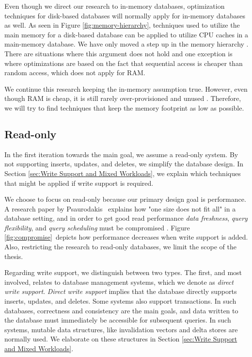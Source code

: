 Even though we direct our research to in-memory databases, optimization techniques for disk-based databases will normally apply for in-memory databases as well. As seen in Figure \ref{fig:memory-hierarchy}, techniques used to utilize the main memory for a disk-based database can be applied to utilize CPU caches in a main-memory database. We have only moved a step up in the memory hierarchy \cite{Boncz2002-yj}. There are situations where this argument does not hold and one exception is where optimizations are based on the fact that sequential access is cheaper than random access, which does not apply for RAM.

We continue this research keeping the in-memory assumption true. However, even though RAM is cheap, it is still rarely over-provisioned and unused \cite{Barber2014-ey}. Therefore, we will try to find techniques that keep the memory footprint as low as possible.


\subsection{Read-only}
\label{sub:Read-only}
In the first iteration towards the main goal, we assume a read-only system. By not supporting inserts, updates, and deletes, we simplify the database design. In Section \ref{sec:Write Support and Mixed Workloads}, we explain which techniques that might be applied if write support is required.

We choose to focus on read-only because our primary design goal is performance. A research paper by Psaurodakis \ea~explains how "one size does not fit all" in a database setting, and in order to get good read performance \textit{data freshness}, \textit{query flexibility}, and \textit{query scheduling} must be compromised \cite{Psaroudakis2014-ma}. Figure \ref{fig:compromise}~depicts how performance decreases when write support is added. Also, restricting the research to read-only databases, we limit the scope of the thesis. 


Regarding write support, we distinguish between two types. The first, and most involved, relates to database management systems, which we denote as \textit{direct write support}. \textit{Direct write support} implies that the database directly supports inserts, updates, and deletes. Some systems also support transactions. In such databases, correctness and consistency are the main goals, and data written to the database must immediately be accessible for subsequent queries. In such systems, mutable data structures, like invalidation vectors and delta stores are normally used. We elaborate on these structures in Section \ref{sec:Write Support and Mixed Workloads}.


